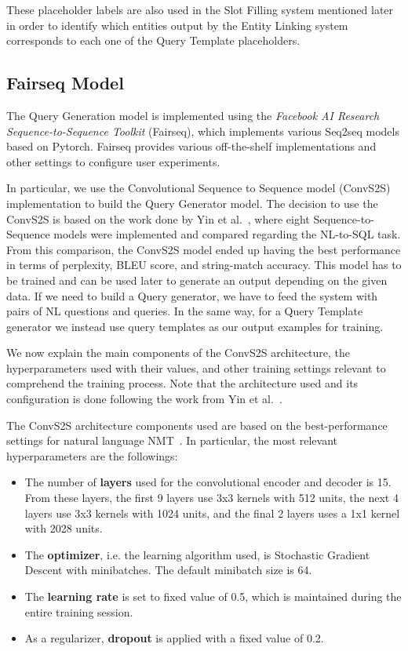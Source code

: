 These placeholder labels are also used in the Slot Filling system mentioned later in order to 
identify which entities output by the Entity Linking system corresponds to each one of the 
Query Template placeholders. 

\subsection{Fairseq Model}
\label{cap3:system/queryGenModule/fairseqModel}
The Query Generation model is implemented using the \textit{Facebook AI Research Sequence-to-Sequence 
Toolkit} (Fairseq), which implements various Seq2seq models based on Pytorch. Fairseq 
provides various off-the-shelf implementations and other settings to configure user 
experiments. 

In particular, we use the Convolutional Sequence to Sequence model (ConvS2S)~\cite{nmt:convS2S-GehringAGYD17} 
implementation to build the Query Generator model. The decision to use the ConvS2S is based 
on the work done by Yin et al.~\cite{nmt:nl-to-sparql-Yin19}, where eight Sequence-to-Sequence 
models were implemented and compared regarding the NL-to-SQL task. From this comparison, 
the ConvS2S model ended up having the best performance in terms of perplexity, BLEU score, 
and string-match accuracy. This model has to be trained and can be used later to generate an 
output depending on the given data. If we need to build a \SPARQL{} Query generator, we have to 
feed the system with pairs of NL questions and \SPARQL{} queries. In the same way, for a Query 
Template generator we instead use query templates as our output examples for training.

We now explain the main components of the ConvS2S architecture, the hyperparameters used with 
their values, and other training settings relevant to comprehend the training process. Note 
that the architecture used and its configuration is done following the work from 
Yin et al.~\cite{nmt:nl-to-sparql-Yin19}.

The ConvS2S architecture components used are based on the best-performance settings for 
natural language NMT~\cite{nmt:nl-to-sparql-Yin19}. In particular, the most relevant 
hyperparameters are the followings:

\begin{itemize}
    \item The number of \textbf{layers} used for the convolutional encoder and decoder is 15. 
    From these layers, the first 9 layers use 3x3 kernels with 512 units, the next 4 layers 
    use 3x3 kernels with 1024 units, and the final 2 layers uses a 1x1 kernel with 2028 units.
    \item The \textbf{optimizer}, i.e. the learning algorithm used, is Stochastic Gradient 
    Descent with minibatches. The default minibatch size is 64.
    \item The \textbf{learning rate} is set to fixed value of 0.5, which is maintained during 
    the entire training session.
    \item As a regularizer, \textbf{dropout} is applied with a fixed value of 0.2.
\end{itemize}

